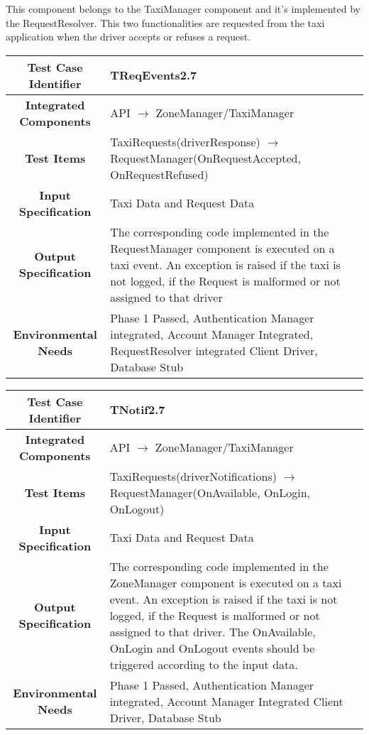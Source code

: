 \documentclass[11pt, a4paper,titlepage]{article}
\begin{document}
	 	This component belongs to the TaxiManager component and it's implemented by the RequestResolver. This two functionalities are requested from the taxi application when the driver accepts or refuses a request.
	 \begin{tabularx}{\textwidth}{| c|X|}
	 	\hline \textbf{Test Case Identifier} & \label{TReqEvents2.7}TReqEvents2.7\\
	 	\hline \textbf{Integrated Components} & API  $\rightarrow $  ZoneManager/TaxiManager \\
	 	\hline \textbf{Test Items} & TaxiRequests(driverResponse) $\rightarrow $ RequestManager(OnRequestAccepted, OnRequestRefused) \\
	 	\hline \textbf{Input Specification} & Taxi Data and Request Data \\
	 	\hline \textbf{Output Specification} & The corresponding code implemented in the RequestManager component is executed on a taxi event. \newline An exception is raised if the taxi is not logged, if the Request is malformed or not assigned to that driver \\
	 	\hline \textbf{Environmental Needs} &  Phase 1 Passed, Authentication Manager integrated, Account Manager Integrated, RequestResolver integrated \newline 
	 	Client Driver, Database Stub\\
	 	\hline
	 \end{tabularx}
	 \newline	
	 	
	 \begin{tabularx}{\textwidth}{| c|X|}
			 	\hline \textbf{Test Case Identifier} & \label{TNotif2.7}TNotif2.7\\
			 	\hline \textbf{Integrated Components} & API  $\rightarrow $  ZoneManager/TaxiManager \\
			 	\hline \textbf{Test Items} & TaxiRequests(driverNotifications) $\rightarrow $ RequestManager(OnAvailable, OnLogin, OnLogout) \\
			 	\hline \textbf{Input Specification} & Taxi Data and Request Data \\
			 	\hline \textbf{Output Specification} & The corresponding code implemented in the ZoneManager component is executed on a taxi event. \newline An exception is raised if the taxi is not logged, if the Request is malformed or not assigned to that driver. \newline
			 	The OnAvailable, OnLogin and OnLogout events should be triggered according to the input data. \\
			 	\hline \textbf{Environmental Needs} &  Phase 1 Passed, Authentication Manager integrated, Account Manager Integrated \newline 
			 	Client Driver, Database Stub\\
			 	\hline
	 \end{tabularx}
	 \newline
	 
\end{document}
